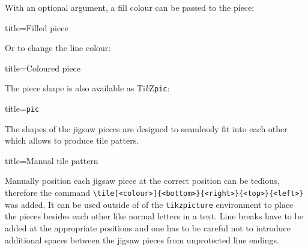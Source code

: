 \documentclass[parskip=half]{scrartcl}
\newcommand{\TikZ}{Ti\emph{k}Z\xspace}
\begin{document}
With an optional argument, a fill colour can be passed to the piece:

\begin{tcblisting}{title={Filled piece}}
\end{tcblisting}

Or to change the line colour:

\begin{tcblisting}{title={Coloured piece}}
\end{tcblisting}

The piece shape is also available as \TikZ \verb|pic|:

\begin{tcblisting}{title={\texttt{pic}}}
\end{tcblisting}


The shapes of the jigsaw pieces are designed to seamlessly fit into each other which allows to produce tile patters.

\begin{tcblisting}{title={Manual tile pattern}}
\end{tcblisting}

Manually position each jigsaw piece at the correct position can be tedious, therefore the command \lstinline|\tile[<colour>]{<bottom>}{<right>}{<top>}{<left>}| was added. It can be used outside of of the \lstinline|tikzpicture| environment to place the pieces besides each other like normal letters in a text. Line breaks have to be added at the appropriate positions and one has to be careful not to introduce additional spaces between the jigsaw pieces from unprotected line endings.
\end{document}
